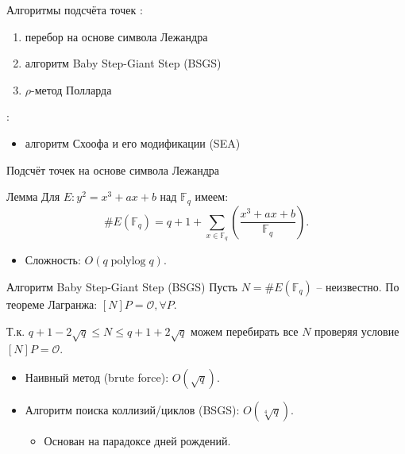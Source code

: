 \documentclass{beamer}
\begin{document}
\begin{frame}{Алгоритмы подсчёта точек}
	:
	\begin{enumerate}
		\item перебор на основе символа Лежандра
		\item алгоритм Baby Step-Giant Step (BSGS)
		\item $\rho$-метод Полларда
	\end{enumerate}
	\vspace{0.5em}
	:
	\begin{itemize}
		\item алгоритм Схоофа и его модификации (SEA)
	\end{itemize}
\end{frame}

\begin{frame}{Подсчёт точек на основе символа Лежандра}
\begin{block}{Лемма}
Для $E: y^2 = x^3 + ax + b$ над $\mathbb{F}_q$ имеем:
\[
\# E(\mathbb{F}_q) = q + 1 + \sum\limits_{x \in \mathbb{F}_q} {\left(\frac{x^3 + ax + b}{\mathbb{F}_q} \right)}.
\]
\end{block}

\begin{itemize}
    \item Сложность: $O(q \operatorname{polylog}{q})$.
\end{itemize}
\end{frame}

\begin{frame}{Алгоритм Baby Step-Giant Step (BSGS)}
 Пусть $N = \#E(\mathbb{F}_q)$ -- неизвестно. По теореме Лагранжа: $[N] P = \mathcal{O}, \forall P$. 

\vspace{0.5em}
Т.к. $q + 1 - 2 \sqrt{q} \leq N \leq q + 1 + 2 \sqrt{q}$ \structure{$\implies$} можем перебирать все $N$ проверяя условие $[N] P = \mathcal{O}$.

\vspace{0.5em}
\begin{itemize}
    \item Наивный метод (brute force): $O(\sqrt{q})$.
    \item Алгоритм поиска коллизий/циклов (BSGS): $O(\sqrt[4]{q})$.
    \begin{itemize}
    	\item Основан на парадоксе дней рождений.
    \end{itemize}
\end{itemize}
\end{frame}
\end{document}
